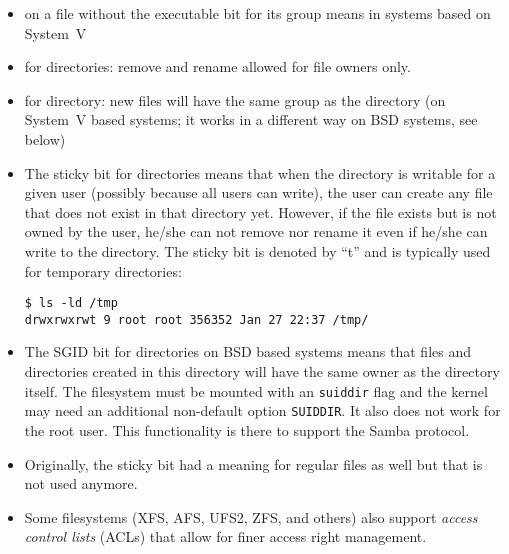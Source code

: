 

\begin{slide}
\begin{center}

\end{center}
\begin{itemize}
\item {} on a file without the executable bit for its group means
 in systems based on System~V
\item {} for directories: remove and rename allowed for file
owners only.
\item {} for directory: new files will have the same group as the
directory (on System~V based systems; it works in a different way on BSD
systems, see below)
\end{itemize}
\end{slide}

\begin{itemize}
\item The sticky bit for directories means that when the directory is writable
for a given user (possibly because all users can write), the user can create any
file that does not exist in that directory yet.  However, if the file exists but
is not owned by the user, he/she can not remove nor rename it even if
he/she can write to the directory.  The sticky bit is denoted by ``t'' and is
typically used for temporary directories:

\begin{verbatim}
$ ls -ld /tmp
drwxrwxrwt 9 root root 356352 Jan 27 22:37 /tmp/
\end{verbatim}

\item The SGID bit for directories on BSD based systems means that files and
directories created in this directory will have the same owner as the directory
itself.  The filesystem must be mounted with an \texttt{suiddir} flag and
the kernel may need an additional non-default option \texttt{SUIDDIR}.  It also
does not work for the root user.  This functionality is there to support the
Samba protocol.
\item Originally, the sticky bit had a meaning for regular files as well but
that is not used anymore.
\item Some filesystems (XFS, AFS, UFS2, ZFS, and others) also support
\emph{access control lists} (ACLs) that allow for finer access right management.
\end{itemize}

